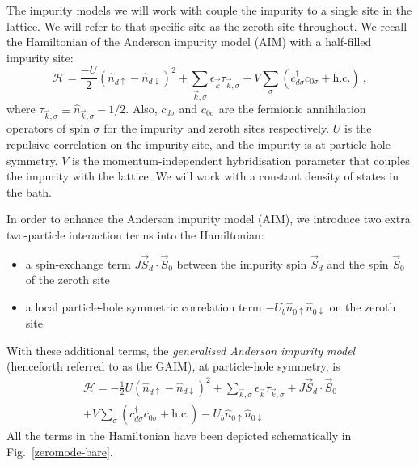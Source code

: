 \documentclass[reprint,superscriptaddress,floatfix]{revtex4-2}
\begin{document}
The impurity models we will work with couple the impurity to a single site in the lattice. We will refer to that specific site as the zeroth site throughout. We recall the Hamiltonian of the Anderson impurity model (AIM) with a half-filled impurity site:
\begin{equation} 
	\mathcal{H} = \frac{- U}{2} \left(\hat n_{d \uparrow} - \hat n_{d \downarrow}\right)^2 + \sum_{\vec k,\sigma} \epsilon_{\vec k} \tau_{\vec k,\sigma} + V\sum_\sigma \left( c^\dagger_{d\sigma}c_{0\sigma} + \text{h.c.}\right)~,
 \end{equation}
where \(\tau_{\vec k,\sigma} \equiv \hat n_{\vec k,\sigma} - 1/2\). Also, \(c_{d\sigma}\) and \(c_{0\sigma}\) are the fermionic annihilation operators of spin \(\sigma\) for the impurity and zeroth sites respectively. \(U\) is the repulsive correlation on the impurity site, and the impurity is at particle-hole symmetry. \(V\) is the momentum-independent hybridisation parameter that couples the impurity with the lattice. We will work with a constant density of states in the bath. 

In order to enhance the Anderson impurity model (AIM), we introduce two extra two-particle interaction terms into the Hamiltonian:
\begin{itemize}
	\item a spin-exchange term \(J \vec{S}_d\cdot\vec{S}_0\) between the impurity spin \(\vec S_d\) and the spin \(\vec S_0\) of the zeroth site 
	\item a local particle-hole symmetric correlation term \(-U_b \hat n_{0 \uparrow} \hat n_{0 \downarrow}\) on the zeroth site
\end{itemize}

With these additional terms, the {\it generalised Anderson impurity model} (henceforth referred to as the GAIM), at particle-hole symmetry, is
\begin{equation}\begin{aligned}
	\label{GIAM-ham}
	\mathcal{H} = -\frac{1}{2}U \left(\hat n_{d \uparrow} - \hat n_{d \downarrow}\right)^2 + \sum_{\vec k,\sigma} \epsilon_{\vec k} \tau_{\vec k,\sigma} + J \vec{S}_d\cdot\vec{S}_0 \\
	+ V\sum_\sigma \left( c^\dagger_{d\sigma}c_{0\sigma} + \text{h.c.}\right) - U_b \hat n_{0 \uparrow} \hat n_{0 \downarrow}
\end{aligned}\end{equation}
All the terms in the Hamiltonian have been depicted schematically in Fig.~\ref{zeromode-bare}.
\end{document}
